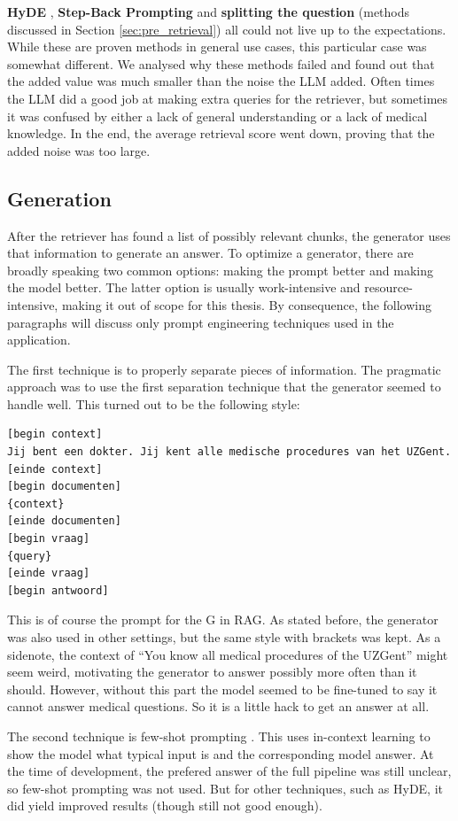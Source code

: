 \textbf{HyDE} \cite{gao2023precisehyde}, \textbf{Step-Back Prompting} \cite{zheng2023takeastepback} and \textbf{splitting the question} (methods discussed in Section \ref{sec:pre_retrieval}) all could not live up to the expectations. While these are proven methods in general use cases, this particular case was somewhat different. We analysed why these methods failed and found out that the added value was much smaller than the noise the LLM added. Often times the LLM did a good job at making extra queries for the retriever, but sometimes it was confused by either a lack of general understanding or a lack of medical knowledge. In the end, the average retrieval score went down, proving that the added noise was too large.

\subsection{Generation}
After the retriever has found a list of possibly relevant chunks, the generator uses that information to generate an answer. To optimize a generator, there are broadly speaking two common options: making the prompt better and making the model better. The latter option is usually work-intensive and resource-intensive, making it out of scope for this thesis. By consequence, the following paragraphs will discuss only prompt engineering techniques used in the application.

The first technique is to properly separate pieces of information. The pragmatic approach was to use the first separation technique that the generator seemed to handle well. This turned out to be the following style:
\begin{verbatim}
[begin context]
Jij bent een dokter. Jij kent alle medische procedures van het UZGent.
[einde context]
[begin documenten]
{context}
[einde documenten]
[begin vraag]
{query}
[einde vraag]
[begin antwoord]
\end{verbatim}
This is of course the prompt for the G in RAG. As stated before, the generator was also used in other settings, but the same style with brackets was kept. As a sidenote, the context of ``You know all medical procedures of the UZGent'' might seem weird, motivating the generator to answer possibly more often than it should. However, without this part the model seemed to be fine-tuned to say it cannot answer medical questions. So it is a little hack to get an answer at all.

The second technique is few-shot prompting \cite{brown2020languagepromptengineering}. This uses in-context learning to show the model what typical input is and the corresponding model answer. At the time of development, the prefered answer of the full pipeline was still unclear, so few-shot prompting was not used. But for other techniques, such as HyDE, it did yield improved results (though still not good enough). 

